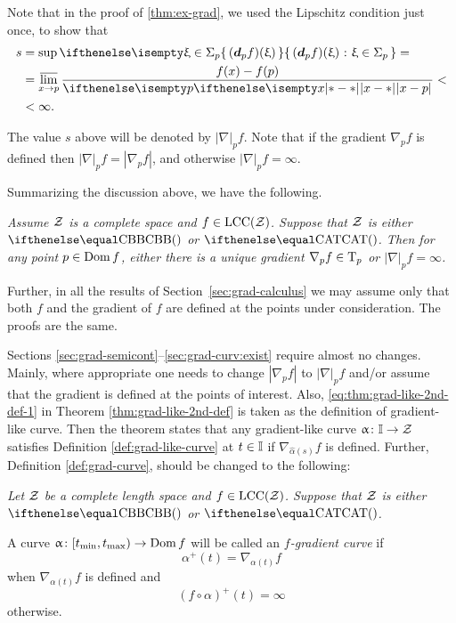 Note that in the proof of \ref{thm:ex-grad}, 
we used the Lipschitz condition just once,
to show that 
\begin{align*}
s&=\sup\set{(\dd_p f)(\xi)}{\xi\in\Sigma_p}=
\\
&=\limsup_{x\to p}\frac{f(x)-f(p)}{\dist{x}{p}{}}<
\\
&<\infty.
\end{align*}


The value $s$ above will be denoted by $|\nabla|_pf$.
Note that 
if the gradient $\nabla_pf$ is defined then $|\nabla|_pf=|\nabla_pf|$,
and otherwise $|\nabla|_pf=\infty$.

Summarizing the discussion above, 
we have the following.

\textit{Assume $\mathcal{Z}$ is a complete space and $f\in \LSCSC(\spc{Z})$. 
Suppose that $\mathcal{Z}$ is either $\Alex{}$ or $\CAT{}$.
Then for any point $p\in \Dom f$, either there is a unique gradient $\nabla_p f\in \T_p$ 
or $|\nabla|_pf=\infty$.}

\medskip

Further, in all the results of Section~\ref{sec:grad-calculus} 
we may assume only that both $f$ and the gradient of $f$ are defined at the points under consideration. The proofs are the same.

Sections \ref{sec:grad-semicont}--\ref{sec:grad-curv:exist}
require almost no changes.
Mainly, where appropriate
one needs to change $|\nabla_p f|$ 
to $|\nabla|_pf$ 
and/or assume that the gradient is defined at the points of interest.
Also,  \ref{eq:thm:grad-like-2nd-def-1} in Theorem \ref{thm:grad-like-2nd-def}
is taken as the definition of gradient-like curve.
Then the theorem states that any  gradient-like curve $\alpha\:\II\to\spc{Z}$ satisfies Definition \ref{def:grad-like-curve} at $t\in \II$ if $\nabla_{\hat\alpha(s)} f$ is defined.
Further, Definition \ref{def:grad-curve}, should be changed to the following:

\medskip

{\it Let $\mathcal{Z}$ be a complete length space
and $f\in\LSCSC(\spc{Z})$.
Suppose that $\mathcal{Z}$ is either $\Alex{}$ or $\CAT{}$.

A curve 
$\alpha\:[t_{\min},t_{\max})\to\Dom f$ will be called an  \emph{$f$-gradient curve} if
\[\alpha^+(t)=\nabla_{\alpha(t)} f\]
when $\nabla_{\alpha(t)} f$ is defined and 
\[(f\circ\alpha)^+(t)=\infty\]
otherwise.}


